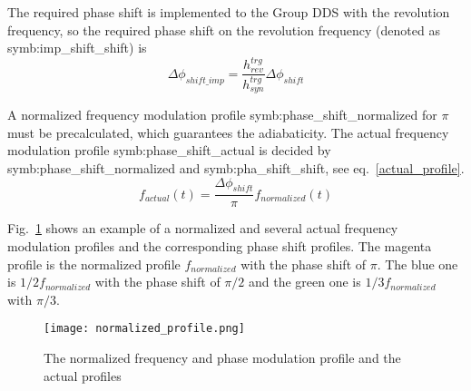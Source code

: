 The required phase shift is implemented to the Group DDS with the revolution frequency, so the required phase shift on the revolution frequency (denoted as \gls{symb:imp_shift_shift}) is 
\begin{equation}
\Delta \phi_\mathit{shift\_imp}= \frac{h_{\mathit{rev}}^{trg}}{h_{\mathit{syn}}^{trg}}\Delta \phi_\mathit{shift}
\end{equation}

A normalized frequency modulation profile \gls{symb:phase_shift_normalized} for $\pi$ must be precalculated, which guarantees the adiabaticity. The actual frequency modulation profile \gls{symb:phase_shift_actual} is decided by \gls{symb:phase_shift_normalized} and \gls{symb:pha_shift_shift}, see eq.~\ref{actual_profile}. 
\begin{equation}
f_{\mathit{actual}}(t)=\frac{\Delta \phi_\mathit{shift}}{\pi}f_{\mathit{normalized}}(t) \label{actual_profile}
\end{equation}

Fig.~\ref{normalized_profile} shows an example of a normalized and several actual frequency  modulation profiles and the corresponding phase shift profiles. The magenta profile is the normalized profile $f_{normalized}$ with the phase shift of $\pi$. The blue one is $1/2 f_{\mathit{normalized}}$ with the phase shift of $\pi/2$ and the green one is $1/3 f_{\mathit{normalized}}$ with $\pi/3$. 

\begin{figure}[!htb]
   \centering   
   \texttt{[image: normalized\_profile.png]}
   \caption{The normalized frequency and phase modulation profile and the actual profiles}
   \label{normalized_profile}
\end{figure}  

